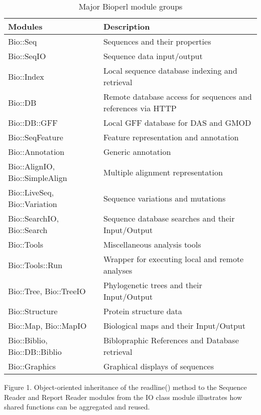 \documentclass[12pt]{article}
\begin{document}
\begin{table}[h]
\begin{tabular}{|l|l|}
\hline
\textbf{Modules} & \textbf{Description} \\
\hline
Bio::Seq &  Sequences and their properties \\
Bio::SeqIO & Sequence data input/output \\
Bio::Index & Local sequence database indexing and retrieval \\ 
Bio::DB & Remote database access for sequences and references via HTTP \\
Bio::DB::GFF & Local GFF database for DAS and GMOD \\
Bio::SeqFeature & Feature representation and annotation \\
Bio::Annotation & Generic annotation \\
Bio::AlignIO, Bio::SimpleAlign & Multiple alignment representation \\
Bio::LiveSeq, Bio::Variation & Sequence variations and mutations \\
Bio::SearchIO, Bio::Search  & Sequence database searches and their Input/Output \\
Bio::Tools &  Miscellaneous analysis tools \\
Bio::Tools::Run &  Wrapper for executing local and remote analyses \\
Bio::Tree, Bio::TreeIO & Phylogenetic trees and their Input/Output  \\
Bio::Structure & Protein structure data \\
Bio::Map, Bio::MapIO & Biological maps and their Input/Output \\
Bio::Biblio, Bio::DB::Biblio & Biblopraphic References and Database
retrieval \\ 
Bio::Graphics & Graphical displays of sequences \\
\hline
\end{tabular}
\caption{Major Bioperl module groups}
\label{modules}
\end{table}

\newpage


Figure 1.  Object-oriented inheritance of the readline() method to the
Sequence Reader and Report Reader modules from the IO class module
illustrates how shared functions can be aggregated and reused.

\newpage

\end{document}

